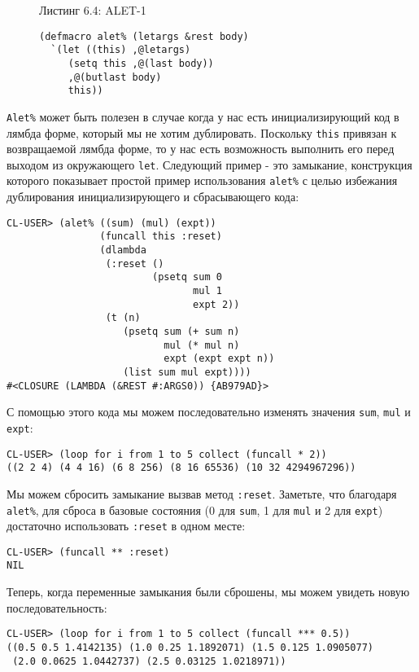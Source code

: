 \begin{figure}Листинг 6.4: ALET-1\label{listing_6.4}
\listbegin
\begin{verbatim}
(defmacro alet% (letargs &rest body)
  `(let ((this) ,@letargs)
     (setq this ,@(last body))
     ,@(butlast body)
     this))
\end{verbatim}
\listend
\end{figure}

\verb"Alet%" может быть полезен в случае когда у нас есть инициализирующий код в лямбда форме, который мы не хотим дублировать. Поскольку \verb"this" привязан к возвращаемой лямбда форме, то у нас есть возможность выполнить его перед выходом из окружающего \verb"let". Следующий пример - это замыкание, конструкция которого показывает простой пример использования \verb"alet%" с целью избежания дублирования инициализирующего и сбрасывающего кода:

\begin{verbatim}
CL-USER> (alet% ((sum) (mul) (expt))
                (funcall this :reset)
                (dlambda
                 (:reset ()
                         (psetq sum 0
                                mul 1
                                expt 2))
                 (t (n)
                    (psetq sum (+ sum n)
                           mul (* mul n)
                           expt (expt expt n))
                    (list sum mul expt))))
#<CLOSURE (LAMBDA (&REST #:ARGS0)) {AB979AD}>
\end{verbatim}

С помощью этого кода мы можем последовательно изменять значения \verb"sum", \verb"mul" и \verb"expt":

\begin{verbatim}
CL-USER> (loop for i from 1 to 5 collect (funcall * 2))
((2 2 4) (4 4 16) (6 8 256) (8 16 65536) (10 32 4294967296))
\end{verbatim}

Мы можем сбросить замыкание вызвав метод \verb":reset". Заметьте, что благодаря \verb"alet%", для сброса в базовые состояния (0 для \verb"sum", 1 для \verb"mul" и 2 для \verb"expt") достаточно использовать \verb":reset" в одном месте:

\begin{verbatim}
CL-USER> (funcall ** :reset)
NIL
\end{verbatim}

Теперь, когда переменные замыкания были сброшены, мы можем увидеть новую последовательность:

\begin{verbatim}
CL-USER> (loop for i from 1 to 5 collect (funcall *** 0.5))
((0.5 0.5 1.4142135) (1.0 0.25 1.1892071) (1.5 0.125 1.0905077)
 (2.0 0.0625 1.0442737) (2.5 0.03125 1.0218971))
\end{verbatim}


